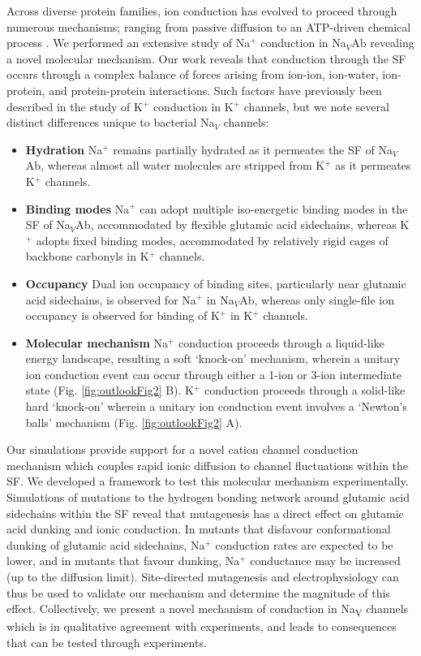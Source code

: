 \begin{refsection}
Across diverse protein families, ion conduction has evolved to proceed through numerous mechanisms; ranging from passive diffusion to an ATP-driven chemical process \cite{Zheng:2015vj}. We performed an extensive study of Na$^+$ conduction in Na$_V$Ab revealing a novel molecular mechanism. Our work reveals that conduction through the SF occurs through a complex balance of forces arising from ion-ion, ion-water, ion-protein, and protein-protein interactions. Such factors have previously been described in the study of K$^+$ conduction in K$^+$ channels, but we note several distinct differences unique to bacterial Na$_V$ channels:
\begin{itemize}
\item \textbf{Hydration} Na$^+$ remains partially hydrated as it permeates the SF of Na$_V$Ab, whereas almost all water molecules are stripped from K$^+$ as it permeates K$^+$ channels.
\item \textbf{Binding modes} Na$^+$ can adopt multiple iso-energetic binding modes in the SF of Na$_V$Ab, accommodated by flexible glutamic acid sidechains, whereas K$^+$ adopts fixed binding modes, accommodated by relatively rigid cages of backbone carbonyls in K$^+$ channels. 
\item \textbf{Occupancy} Dual ion occupancy of binding sites, particularly near glutamic acid sidechains, is observed for Na$^+$ in Na$_V$Ab, whereas only single-file ion occupancy is observed for binding of K$^+$ in K$^+$ channels.
\item \textbf{Molecular mechanism} Na$^+$ conduction proceeds through a liquid-like energy landscape, resulting a soft `knock-on' mechanism, wherein a unitary ion conduction event can occur through either a 1-ion or 3-ion intermediate state (Fig. \ref{fig:outlookFig2} B). K$^+$ conduction proceeds through a solid-like hard `knock-on' wherein a unitary ion conduction event involves a `Newton's balls' mechanism (Fig. \ref{fig:outlookFig2} A).
\end{itemize}

Our simulations provide support for a novel cation channel conduction mechanism which couples rapid ionic diffusion to channel fluctuations within the SF. We developed a framework to test this molecular mechanism experimentally. Simulations of mutations to the hydrogen bonding network around glutamic acid sidechains within the SF reveal that mutagenesis has a direct effect on glutamic acid dunking and ionic conduction. In mutants that disfavour conformational dunking of glutamic acid sidechains, Na$^+$ conduction rates are expected to be lower, and in mutants that favour dunking, Na$^+$ conductance may be increased (up to the diffusion limit). Site-directed mutagenesis and electrophysiology can thus be used to validate our mechanism and determine the magnitude of this effect. Collectively, we present a novel mechanism of conduction in Na\textsubscript{V} channels which is in qualitative agreement with experiments, and leads to consequences that can be tested through experiments.


\end{refsection}
